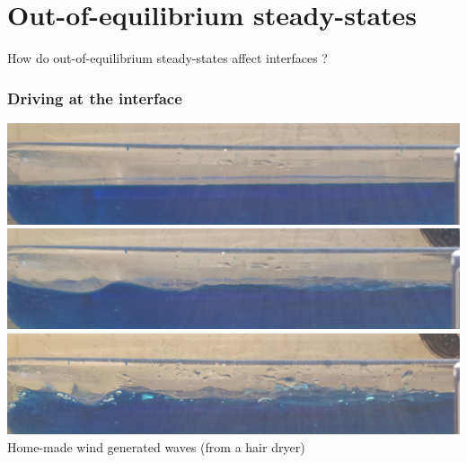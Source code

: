 \documentclass[9pt, dvipsnames]{beamer} %
\begin{document}
\section{Out-of-equilibrium steady-states}

\begin{frame}
	\centering
	\huge How do out-of-equilibrium steady-states affect interfaces ?
\end{frame}

\begin{frame}
    \frametitle{Driving at the interface}
    \centering
    \includegraphics[width=0.8\linewidth]{wave-0.jpg}  \\
    \vspace{0.5cm}
    \includegraphics[width=0.8\linewidth]{wave-1.jpg} \\
    \vspace{0.5cm}    
    \includegraphics[width=0.8\linewidth]{wave-2.jpg} \\ 
	Home-made wind generated waves (from a hair dryer)
\end{frame}
\end{document}
